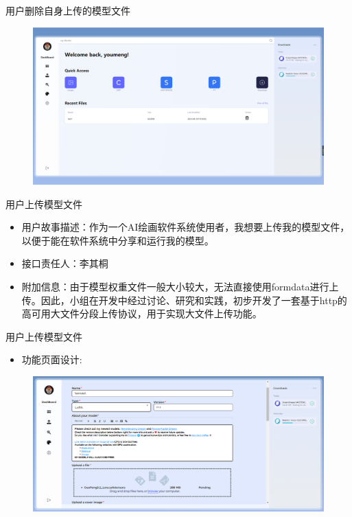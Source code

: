 \begin{frame}{用户删除自身上传的模型文件}
    \begin{figure}[H]
        \centering
        \includegraphics[width=\textwidth]{contents/figure/remove_result.jpg}
    \end{figure}
\end{frame}

\begin{frame}{用户上传模型文件}
    \begin{itemize}
        \item 用户故事描述：作为一个AI绘画软件系统使用者，我想要上传我的模型文件，以便于能在软件系统中分享和运行我的模型。
        \item 接口责任人：李其桐
        \item 附加信息：由于模型权重文件一般大小较大，无法直接使用formdata进行上传。因此，小组在开发中经过讨论、研究和实践，初步开发了一套基于http的高可用大文件分段上传协议，用于实现大文件上传功能。
    \end{itemize}
\end{frame}

\begin{frame}{用户上传模型文件}
    \begin{itemize}
        \item 功能页面设计:
    \end{itemize}
    \begin{figure}[H]
        \centering
        \includegraphics[width=\textwidth]{contents/figure/model_upload.png}
    \end{figure}
\end{frame}

